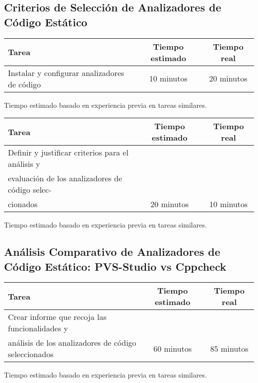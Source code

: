 \documentclass[12pt,a4paper]{article}
\begin{document}
\subsection{Criterios de Selección de Analizadores de Código Estático}
    \begin{center}
        \begin{tabular}{|l|c|c|}
            \hline
            \textbf{Tarea} & \textbf{Tiempo estimado} & \textbf{Tiempo real} \\
            \hline
            Instalar y configurar analizadores de código & 10 minutos & 20 minutos \\
            \hline
        \end{tabular}
    \end{center}
    \begin{center}
        Tiempo estimado basado en experiencia previa en tareas similares.
    \end{center}
    \begin{center}
        \begin{tabular}{|l|c|c|}
            \hline
            \textbf{Tarea} & \textbf{Tiempo estimado} & \textbf{Tiempo real} \\
            \hline
            Definir y justificar criterios para el análisis y
\\evaluación de los analizadores de código selec-
\\cionados & 20 minutos & 10 minutos \\
            \hline
        \end{tabular}
    \end{center}
    \begin{center}
        Tiempo estimado basado en experiencia previa en tareas similares.
    \end{center}

\subsection{Análisis Comparativo de Analizadores de Código Estático: PVS-Studio vs Cppcheck}
    \begin{center}
        \begin{tabular}{|l|c|c|}
            \hline
            \textbf{Tarea} & \textbf{Tiempo estimado} & \textbf{Tiempo real} \\
            \hline
            Crear informe que recoja las funcionalidades y
\\análisis de los analizadores de código seleccionados & 60 minutos & 85 minutos \\
            \hline
        \end{tabular}
    \end{center}
    \begin{center}
        Tiempo estimado basado en experiencia previa en tareas similares.
    \end{center}
\end{document}
